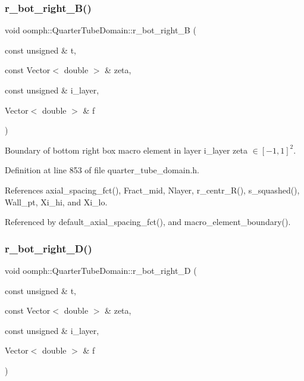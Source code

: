 \subsubsection{\texorpdfstring{r\+\_\+bot\+\_\+right\+\_\+\+B()}{r\_bot\_right\_B()}}
{\footnotesize\ttfamily void oomph\+::\+Quarter\+Tube\+Domain\+::r\+\_\+bot\+\_\+right\+\_\+B (\begin{DoxyParamCaption}\item[{const unsigned \&}]{t,  }\item[{const Vector$<$ double $>$ \&}]{zeta,  }\item[{const unsigned \&}]{i\+\_\+layer,  }\item[{Vector$<$ double $>$ \&}]{f }\end{DoxyParamCaption})\hspace{0.3cm}{\ttfamily [private]}}



Boundary of bottom right box macro element in layer i\+\_\+layer zeta $ \in [-1,1]^2 $. 



Definition at line 853 of file quarter\+\_\+tube\+\_\+domain.\+h.



References axial\+\_\+spacing\+\_\+fct(), Fract\+\_\+mid, Nlayer, r\+\_\+centr\+\_\+\+R(), s\+\_\+squashed(), Wall\+\_\+pt, Xi\+\_\+hi, and Xi\+\_\+lo.



Referenced by default\+\_\+axial\+\_\+spacing\+\_\+fct(), and macro\+\_\+element\+\_\+boundary().

\mbox{\label{classoomph_1_1QuarterTubeDomain_a8f4332d868af0473ec2591790e8498ae}} 
\subsubsection{\texorpdfstring{r\+\_\+bot\+\_\+right\+\_\+\+D()}{r\_bot\_right\_D()}}
{\footnotesize\ttfamily void oomph\+::\+Quarter\+Tube\+Domain\+::r\+\_\+bot\+\_\+right\+\_\+D (\begin{DoxyParamCaption}\item[{const unsigned \&}]{t,  }\item[{const Vector$<$ double $>$ \&}]{zeta,  }\item[{const unsigned \&}]{i\+\_\+layer,  }\item[{Vector$<$ double $>$ \&}]{f }\end{DoxyParamCaption})\hspace{0.3cm}{\ttfamily [private]}}



